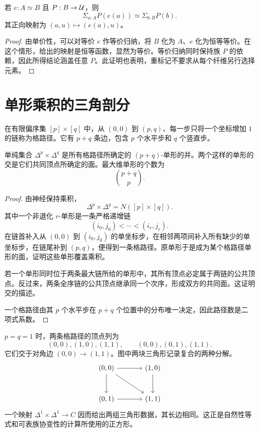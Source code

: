 \begin{proposition}[重标记依赖和]
若 $e:A\simeq B$ 且 $P:B\to\mathcal U$，则
\[
 \Sigma_{a:A}P(e(a))\simeq\Sigma_{b:B}P(b).
\]
其正向映射为 $(a,u)\mapsto(e(a),u)$。
\end{proposition}
\begin{proof}
由单价性，可以对等价 $e$ 作等价归纳，将 $B$ 化为 $A$、$e$ 化为恒等等价。在这个情形，给出的映射是恒等函数，显然为等价。等价归纳同时保持族 $P$ 的依赖，因此所得结论涵盖任意 $P$。此证明也表明，重标记不要求从每个纤维另行选择元素。
\end{proof}

\section{单形乘积的三角剖分}

\begin{definition}[格路径]
在有限偏序集 $[p]\times[q]$ 中，从 $(0,0)$ 到 $(p,q)$、每一步只将一个坐标增加 $1$ 的链称为格路径。它有 $p+q$ 条边，包含 $p$ 个水平步和 $q$ 个竖直步。
\end{definition}

\begin{proposition}[单形乘积的格路径分解]
单纯集合 $\Delta^p\times\Delta^q$ 是所有格路径所确定的 $(p+q)$-单形的并。两个这样的单形的交是它们共同顶点所确定的面。最大维单形的个数为
\[
 \binom{p+q}{p}.
\]
\end{proposition}
\begin{proof}
由神经保持乘积，
\[
 \Delta^p\times\Delta^q=N([p]\times[q]).
\]
其中一个非退化 $r$-单形是一条严格递增链
\[
 (i_0,j_0)<\cdots<(i_r,j_r).
\]
在链首补入从 $(0,0)$ 到 $(i_0,j_0)$ 的单坐标步，在相邻两项间补入所有缺少的单坐标步，在链尾补到 $(p,q)$，便得到一条格路径。原单形于是成为某个格路径单形的面，证明这些单形覆盖乘积。

若一个单形同时位于两条最大链所给的单形中，其所有顶点必定属于两链的公共顶点。反过来，两条全序链的公共顶点继承同一个次序，形成双方的共同面。这证明交的描述。

一个格路径由其 $p$ 个水平步在 $p+q$ 个位置中的分布唯一决定，因此路径数是二项式系数。
\end{proof}

\begin{example}[正方形的两个三角形]
$p=q=1$ 时，两条格路径的顶点列为
\[
 (0,0),(1,0),(1,1),
 \qquad
 (0,0),(0,1),(1,1).
\]
它们交于对角边 $(0,0)\to(1,1)$。图中两块三角形记录复合的两种分解。
\[
\begin{tikzcd}[row sep=large,column sep=large]
 (0,0)\arrow[r]\arrow[d]\arrow[dr]&(1,0)\arrow[d]\\
 (0,1)\arrow[r]&(1,1)
\end{tikzcd}
\]
一个映射 $\Delta^1\times\Delta^1\to C$ 因而给出两组三角形数据，其长边相同。这正是自然性等式和可表族协变性的计算所使用的正方形。
\end{example}

